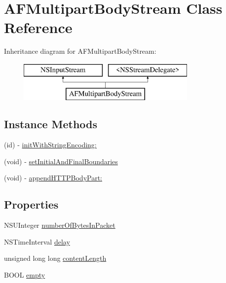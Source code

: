 \hypertarget{interface_a_f_multipart_body_stream}{\section{A\-F\-Multipart\-Body\-Stream Class Reference}
\label{interface_a_f_multipart_body_stream}
}
Inheritance diagram for A\-F\-Multipart\-Body\-Stream\-:\begin{figure}[H]
\begin{center}
\leavevmode
\includegraphics[height=2.000000cm]{interface_a_f_multipart_body_stream}
\end{center}
\end{figure}
\subsection*{Instance Methods}
\begin{DoxyCompactItemize}
\item 
(id) -\/ \hyperlink{interface_a_f_multipart_body_stream_ad574aa0595950246138a1eba40083bd6}{init\-With\-String\-Encoding\-:}
\item 
(void) -\/ \hyperlink{interface_a_f_multipart_body_stream_acb7e1157e8d26b767eb6eff0f950d21f}{set\-Initial\-And\-Final\-Boundaries}
\item 
(void) -\/ \hyperlink{interface_a_f_multipart_body_stream_aa51ac96df564e3876544e75af738d64f}{append\-H\-T\-T\-P\-Body\-Part\-:}
\end{DoxyCompactItemize}
\subsection*{Properties}
\begin{DoxyCompactItemize}
\item 
N\-S\-U\-Integer \hyperlink{interface_a_f_multipart_body_stream_a4f5df6b4fa6024d8bbedf72f2bef974d}{number\-Of\-Bytes\-In\-Packet}
\item 
N\-S\-Time\-Interval \hyperlink{interface_a_f_multipart_body_stream_aabbac8502bef80a07707380ebadb2791}{delay}
\item 
unsigned long long \hyperlink{interface_a_f_multipart_body_stream_aaee3ebc73e6cade317c7524089880b3d}{content\-Length}
\item 
B\-O\-O\-L \hyperlink{interface_a_f_multipart_body_stream_ae9b2a8f4b9b328d29f0b7c64410577c9}{empty}
\end{DoxyCompactItemize}


